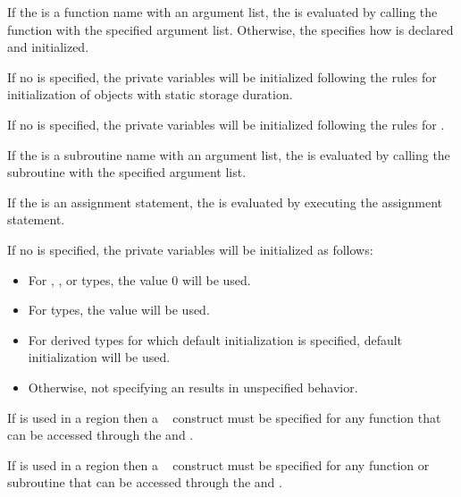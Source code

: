 {{{{\ccppspecificstart
If the  is a function name with an argument list, the  is 
evaluated by calling the function with the specified argument list. Otherwise, the 
 specifies how  is declared and initialized.
\ccppspecificend
\bigskip

\cspecificstart
If no  is specified, the private variables will be initialized following the 
rules for initialization of objects with static storage duration.
\cspecificend

\cppspecificstart
If no  is specified, the private variables will be initialized following the 
rules for .
\cppspecificend
\bigskip

\fortranspecificstart
If the  is a subroutine name with an argument list, the  is 
evaluated by calling the subroutine with the specified argument list.

If the  is an assignment statement, the  is evaluated by 
executing the assignment statement.

If no  is specified, the private variables will be initialized as follows:
\begin{itemize}
\item For , , or  types, the value 0 will be used.
\item For  types, the value  will be used.
\item For derived types for which default initialization is specified, default initialization 
will be used.
\item Otherwise, not specifying an  results in unspecified behavior.
\end{itemize}
\fortranspecificend
\bigskip

\ccppspecificstart
If  is used in a  region then a ~ construct 
must be specified for any function that can be accessed through the  and 
.
\ccppspecificend
\bigskip

\fortranspecificstart
If  is used in a  region then a ~ construct 
must be specified for any function or subroutine that can be accessed through the  
and .
\fortranspecificend

}}}}
